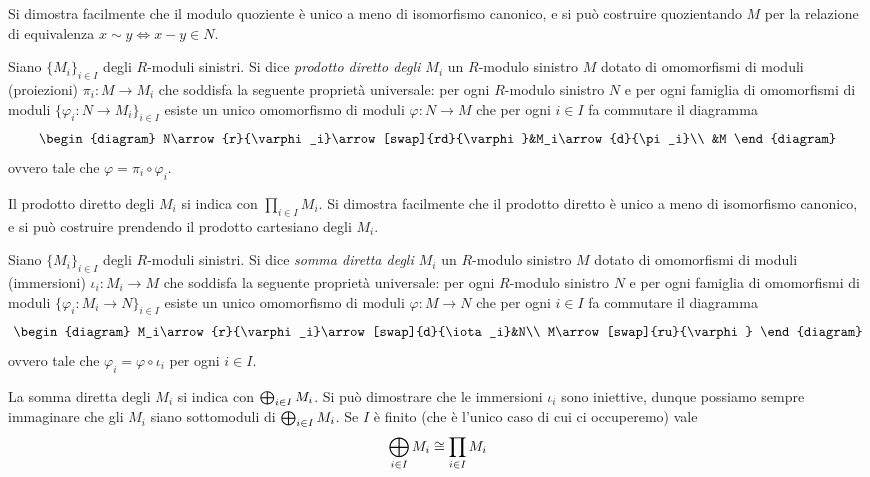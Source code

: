 Si dimostra facilmente che il modulo quoziente è unico a meno di isomorfismo canonico, e si può costruire quozientando $M$ per la relazione di equivalenza $x\sim y\iff x-y\in N$.

\begin{definition}
Siano $\{M_i\}_{i\in I}$ degli $R$-moduli sinistri. Si dice \emph{prodotto diretto degli $M_i$} un $R$-modulo sinistro $M$ dotato di omomorfismi di moduli (proiezioni) $\pi_i:M\to M_i$ che soddisfa la seguente proprietà universale: per ogni $R$-modulo sinistro $N$ e per ogni famiglia di omomorfismi di moduli $\{\varphi_i:N\to M_i\}_{i\in I}$ esiste un unico omomorfismo di moduli $\varphi:N\to M$ che per ogni $i\in I$ fa commutare il diagramma
$$
\begin{diagram}
N\arrow{r}{\varphi_i}\arrow[swap]{rd}{\varphi}&M_i\arrow{d}{\pi_i}\\
&M
\end{diagram}
$$
ovvero tale che $\varphi=\pi_i\circ\varphi_i$.
\end{definition}

Il prodotto diretto degli $M_i$ si indica con $\prod_{i\in I}M_i$. Si dimostra facilmente che il prodotto diretto è unico a meno di isomorfismo canonico, e si può costruire prendendo il prodotto cartesiano degli $M_i$.


\begin{definition}
Siano $\{M_i\}_{i\in I}$ degli $R$-moduli sinistri. Si dice \emph{somma diretta degli $M_i$} un $R$-modulo sinistro $M$ dotato di omomorfismi di moduli (immersioni) $\iota_i:M_i\to M$ che soddisfa la seguente proprietà universale: per ogni $R$-modulo sinistro $N$ e per ogni famiglia di omomorfismi di moduli $\{\varphi_i:M_i\to N\}_{i\in I}$ esiste un unico omomorfismo di moduli $\varphi:M\to N$ che per ogni $i\in I$ fa commutare il diagramma
$$
\begin{diagram}
M_i\arrow{r}{\varphi_i}\arrow[swap]{d}{\iota_i}&N\\
M\arrow[swap]{ru}{\varphi}
\end{diagram}
$$
ovvero tale che $\varphi_i=\varphi\circ\iota_i$ per ogni $i\in I$.
\end{definition}

La somma diretta degli $M_i$ si indica con $\bigoplus_{i\in I}M_i$. Si può dimostrare che le immersioni $\iota_i$ sono iniettive, dunque possiamo sempre immaginare che gli $M_i$ siano sottomoduli di $\bigoplus_{i\in I}M_i$. Se $I$ è finito (che è l'unico caso di cui ci occuperemo) vale
$$
\bigoplus_{i\in I}M_i\cong \prod_{i\in I}M_i
$$

